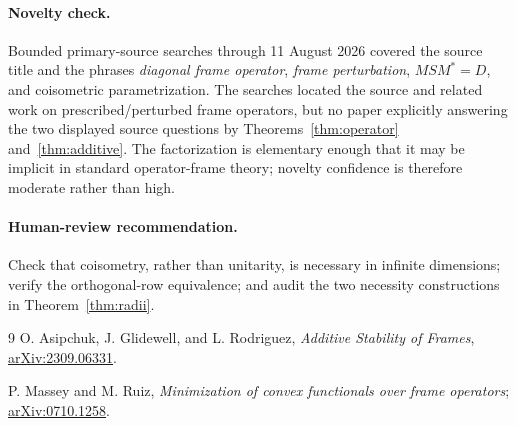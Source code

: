 \documentclass[11pt]{article}
\begin{document}
\paragraph{Novelty check.}
Bounded primary-source searches through 11 August 2026 covered the source
title and the phrases \emph{diagonal frame operator}, \emph{frame
perturbation}, \(MSM^*=D\), and coisometric parametrization. The searches
located the source and related work on prescribed/perturbed frame operators,
but no paper explicitly answering the two displayed source questions by
Theorems~\ref{thm:operator} and~\ref{thm:additive}. The factorization is
elementary enough that it may be implicit in standard operator-frame
theory; novelty confidence is therefore moderate rather than high.

\paragraph{Human-review recommendation.}
Check that coisometry, rather than unitarity, is necessary in infinite
dimensions; verify the orthogonal-row equivalence; and audit the two
necessity constructions in Theorem~\ref{thm:radii}.

\begin{thebibliography}{9}
O. Asipchuk, J. Glidewell, and L. Rodriguez,
\emph{Additive Stability of Frames},
\href{https://arxiv.org/abs/2309.06331}{arXiv:2309.06331}.

P. Massey and M. Ruiz,
\emph{Minimization of convex functionals over frame operators};
\href{https://arxiv.org/abs/0710.1258}{arXiv:0710.1258}.
\end{thebibliography}
\end{document}
